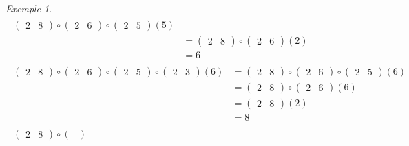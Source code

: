\documentclass{report}
\theoremstyle{definition}
\theoremstyle{remark}
\newtheorem*{exem}{Exemple}
\begin{document}
\begin{exem}
\begin{align*}
\begin{split}
\begin{pmatrix}
					2&8
				\end{pmatrix} \circ \begin{pmatrix}
					2&6
				\end{pmatrix} \circ \begin{pmatrix}
					2&5
				\end{pmatrix}(5)\\
				&= \begin{pmatrix}
					2&8
				\end{pmatrix} \circ \begin{pmatrix}
					2&6
				\end{pmatrix}(2)\\
				&= 6
			\end{split}\tag{5}
			\\[8pt]
			\begin{split}
				\begin{pmatrix}
					2&8
				\end{pmatrix} \circ \begin{pmatrix}
					2&6
				\end{pmatrix} \circ \begin{pmatrix}
					2&5
				\end{pmatrix} \circ \begin{pmatrix}
					2&3
				\end{pmatrix}(6)&= \begin{pmatrix}
					2&8
				\end{pmatrix} \circ \begin{pmatrix}
					2&6
				\end{pmatrix} \circ \begin{pmatrix}
					2&5
				\end{pmatrix}(6)\\
				&= \begin{pmatrix}
					2&8
				\end{pmatrix} \circ \begin{pmatrix}
					2&6
				\end{pmatrix}(6)\\
				&= \begin{pmatrix}
					2&8
				\end{pmatrix}(2)\\
				&= 8
			\end{split}\tag{6}
			\\[8pt]
			\begin{split}
				\begin{pmatrix}
					2&8
				\end{pmatrix} \circ \begin{pmatrix}

\end{pmatrix}
\end{split}
\end{align*}
\end{exem}
\end{document}
